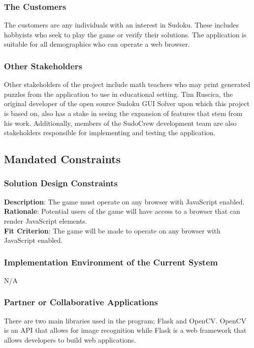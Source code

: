 \documentclass[11pt]{article}
\begin{document}
\subsubsection{The Customers}
The customers are any individuals with an interest in Sudoku. These includes hobbyists who seek to play the game or verify their solutions. The application is suitable for all demographics who can operate a web browser.

\subsubsection{Other Stakeholders}
Other stakeholders of the project include math teachers who may print generated puzzles from the application to use in educational setting. Tim Ruscica, the original developer of the open source Sudoku GUI Solver upon which this project is based on, also has a stake in seeing the expansion of features that stem from his work. Additionally, members of the SudoCrew development team are also stakeholders responsible for implementing and testing the application.

\subsection{Mandated Constraints}
\subsubsection{Solution Design Constraints}
\textbf{Description}: The game must operate on any browser with JavaScript enabled.
\\
\textbf{Rationale}: Potential users of the game will have access to a browser that can render JavaScript elements.
\\
\textbf{Fit Criterion}: The game will be made to operate on any browser with JavaScript enabled.

\subsubsection{Implementation Environment of the Current System}
N/A

\subsubsection{Partner or Collaborative Applications}
There are two main libraries used in the program; Flask and OpenCV. OpenCV is an API that allows for image recognition while Flask is a web framework that allows developers to build web applications.
\end{document}
